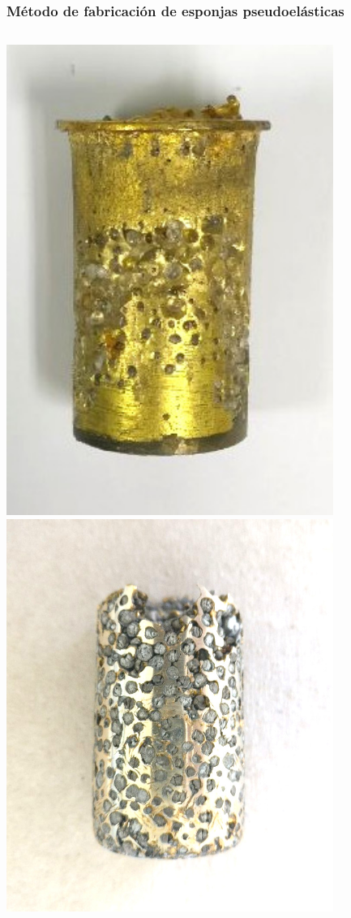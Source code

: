 \documentclass[usenames,dvipsnames]{beamer}
\begin{document}
\begin{frame}

\frametitle{Método de fabricación de esponjas pseudoelásticas}

\begin{center}
\begin{columns}
\includegraphics[width=0.8\textwidth]{img/proceso/proceso1.jpg}
\includegraphics[width=0.8\textwidth]{img/proceso/proceso2.jpg}

\end{columns}
\end{center}
\end{frame}
\end{document}
